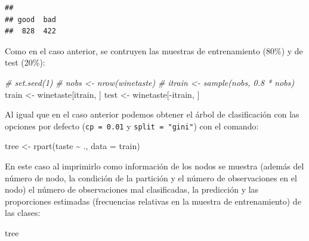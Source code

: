 \documentclass[
  spanish,
]{book}
\newenvironment{Shaded}{\begin{snugshade}}{\end{snugshade}}
\newcommand{\AttributeTok}[1]{\textcolor[rgb]{0.77,0.63,0.00}{#1}}
\newcommand{\CommentTok}[1]{\textcolor[rgb]{0.56,0.35,0.01}{\textit{#1}}}
\newcommand{\FunctionTok}[1]{\textcolor[rgb]{0.00,0.00,0.00}{#1}}
\newcommand{\NormalTok}[1]{#1}
\newcommand{\OtherTok}[1]{\textcolor[rgb]{0.56,0.35,0.01}{#1}}
\newcommand{\SpecialCharTok}[1]{\textcolor[rgb]{0.00,0.00,0.00}{#1}}
\theoremstyle{break}
\theoremstyle{definition}
\theoremstyle{definition}
\theoremstyle{definition}
\theoremstyle{definition}
\theoremstyle{remark}
\begin{document}
\begin{Shaded}
\end{Shaded}

\begin{verbatim}
## 
## good  bad 
##  828  422
\end{verbatim}

Como en el caso anterior, se contruyen las muestras de entrenamiento (80\%) y de test (20\%):

\begin{Shaded}
\begin{Highlighting}[]
\CommentTok{\# set.seed(1)}
\CommentTok{\# nobs \textless{}{-} nrow(winetaste)}
\CommentTok{\# itrain \textless{}{-} sample(nobs, 0.8 * nobs)}
\NormalTok{train }\OtherTok{\textless{}{-}}\NormalTok{ winetaste[itrain, ]}
\NormalTok{test }\OtherTok{\textless{}{-}}\NormalTok{ winetaste[}\SpecialCharTok{{-}}\NormalTok{itrain, ]}
\end{Highlighting}
\end{Shaded}

Al igual que en el caso anterior podemos obtener el árbol de clasificación con las opciones por defecto (\texttt{cp\ =\ 0.01} y \texttt{split\ =\ "gini"}) con el comando:

\begin{Shaded}
\begin{Highlighting}[]
\NormalTok{tree }\OtherTok{\textless{}{-}} \FunctionTok{rpart}\NormalTok{(taste }\SpecialCharTok{\textasciitilde{}}\NormalTok{ ., }\AttributeTok{data =}\NormalTok{ train)}
\end{Highlighting}
\end{Shaded}

En este caso al imprimirlo como información de los nodos se muestra (además del número de nodo, la condición de la partición y el número de observaciones en el nodo) el número de observaciones mal clasificadas, la predicción y las proporciones estimadas (frecuencias relativas en la muestra de entrenamiento) de las clases:

\begin{Shaded}
\begin{Highlighting}[]
\NormalTok{tree}
\end{Highlighting}
\end{Shaded}
\end{document}
